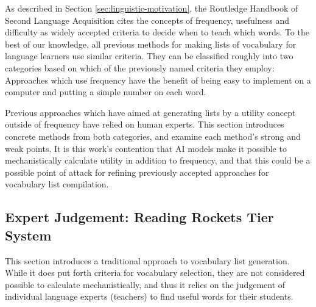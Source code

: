 As described in Section \ref{sec:linguistic-motivation}, the Routledge Handbook of Second Language Acquisition cites the concepts of frequency, usefulness and difficulty as widely accepted criteria to decide when to teach which words.
To the best of our knowledge, all previous methods for making lists of vocabulary for language learners use similar criteria.
They can be classified roughly into two categories based on which of the previously named criteria they employ:
Approaches which use frequency have the benefit of being easy to implement on a computer and putting a simple number on each word.

Previous approaches which have aimed at generating lists by a utility concept outside of frequency have relied on human experts.
This section introduces concrete methods from both categories, and examine each method's strong and weak points.
It is this work's contention that AI models make it possible to mechanistically calculate utility in addition to frequency, and that this could be a possible point of attack for refining previously accepted approaches for vocabulary list compilation.



\subsection{Expert Judgement: Reading Rockets Tier System} \label{sec:reading-rockets}
This section introduces a traditional approach to vocabulary list generation.
While it does put forth criteria for vocabulary selection, they are not considered possible to calculate mechanistically, and thus it relies on the judgement of individual language experts (teachers) to find useful words for their students.

